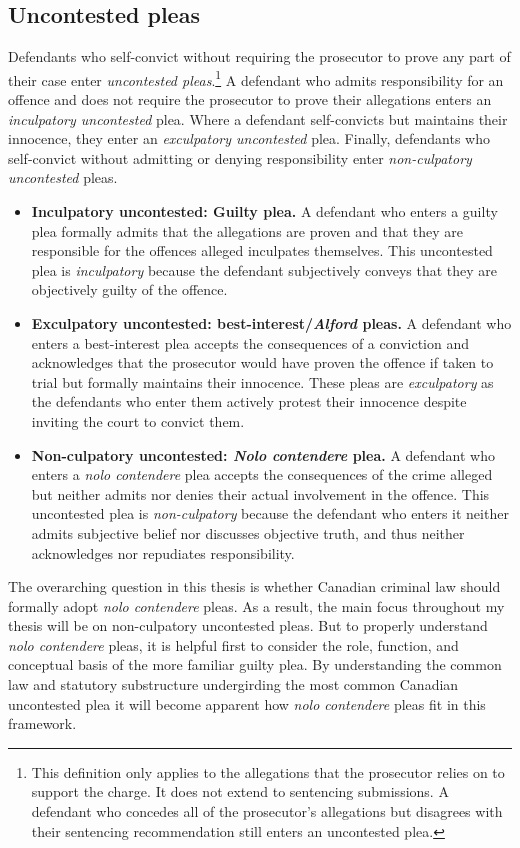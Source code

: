\subsection{Uncontested pleas}

Defendants who self-convict without requiring the prosecutor to prove any part of their case enter \textit{uncontested pleas}.\footnote{This definition only applies to the allegations that the prosecutor relies on to support the charge. It does not extend to sentencing submissions. A defendant who concedes all of the prosecutor's allegations but disagrees with their sentencing recommendation still enters an uncontested plea.} A defendant who admits responsibility for an offence and does not require the prosecutor to prove their allegations enters an \textit{inculpatory uncontested} plea. Where a defendant self-convicts but maintains their innocence, they enter an \textit{exculpatory uncontested} plea. Finally, defendants who self-convict without admitting or denying responsibility enter \textit{non-culpatory uncontested} pleas. 

\begin{itemize}

    \item \textbf{Inculpatory uncontested: Guilty plea.} A defendant who enters a guilty plea formally admits that the allegations are proven and that they are responsible for the offences alleged inculpates themselves. This uncontested plea is \textit{inculpatory} because the defendant subjectively conveys that they are objectively guilty of the offence.

    \item \textbf{Exculpatory uncontested: best-interest/\textit{Alford} pleas.} A defendant who enters a best-interest plea accepts the consequences of a conviction and acknowledges that the prosecutor would have proven the offence if taken to trial but formally maintains their innocence. These pleas are \textit{exculpatory} as the defendants who enter them actively protest their innocence despite inviting the court to convict them.
    
    \item \textbf{Non-culpatory uncontested: \textit{Nolo contendere} plea.} A defendant who enters a \textit{nolo contendere} plea accepts the consequences of the crime alleged but neither admits nor denies their actual involvement in the offence. This uncontested plea is \textit{non-culpatory} because the defendant who enters it neither admits subjective belief nor discusses objective truth, and thus neither acknowledges nor repudiates responsibility.
    
\end{itemize}

The overarching question in this thesis is whether Canadian criminal law should formally adopt \textit{nolo contendere} pleas. As a result, the main focus throughout my thesis will be on non-culpatory uncontested pleas. But to properly understand \textit{nolo contendere} pleas, it is helpful first to consider the role, function, and conceptual basis of the more familiar guilty plea. By understanding the common law and statutory substructure undergirding the most common Canadian uncontested plea it will become apparent how \textit{nolo contendere} pleas fit in this framework.